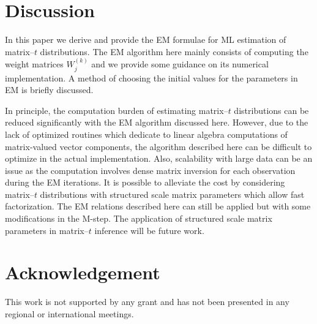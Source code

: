 \documentclass[english,listof=totoc]{scrartcl}
\begin{document}
\section{Discussion}\label{sec:discussion}

In this paper we derive and provide the EM formulae for ML estimation of matrix--$t$ distributions. The EM algorithm here mainly consists of computing the weight matrices $W_j^{(k)}$ and we provide some guidance on its numerical implementation. A method of choosing the initial values for the parameters in EM is briefly discussed.

In principle, the computation burden of estimating matrix--$t$ distributions can be reduced significantly with the EM algorithm discussed here. However, due to the lack of optimized routines which dedicate to linear algebra computations of matrix-valued vector components, the algorithm described here can be difficult to optimize in the actual implementation. Also, scalability with large data can be an issue as the computation involves dense matrix inversion for each observation during the EM iterations. It is possible to alleviate the cost by considering matrix--$t$ distributions with structured scale matrix parameters which allow fast factorization. The EM relations described here can still be applied but with some modifications in the M-step. The application of structured scale matrix parameters in matrix--$t$ inference will be future work.

\section*{Acknowledgement}
This work is not supported by any grant and has not been presented in any regional or international meetings.



\end{document}
